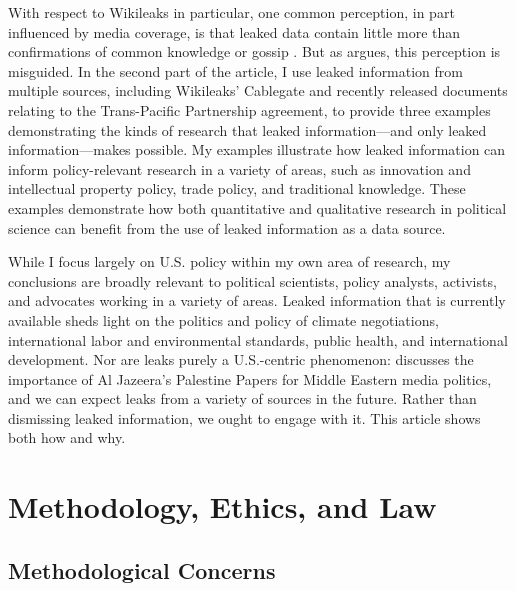 \documentclass[12pt]{article}
\begin{document}
With respect to Wikileaks in particular, one common perception, in part influenced by media 
coverage, is that leaked data contain little more than confirmations of common knowledge or 
gossip \citep{saunders2011wikileaks,chesterman2011wikileaks}. But as \citet{bob2010wikileaks} argues, this perception is 
misguided. In the second part of the article, I use leaked information from multiple sources, including Wikileaks' 
Cablegate and recently 
released documents relating to the Trans-Pacific Partnership agreement, to provide three examples 
demonstrating the kinds of research that leaked information---and only leaked information---makes possible. 
My examples illustrate how leaked information can inform policy-relevant research in a variety of areas, such as 
innovation and intellectual property policy, trade policy, and traditional knowledge.
These examples demonstrate 
how both quantitative and qualitative research in political science can benefit from the use of 
leaked information as a data source. 

While I focus largely on U.S. policy within my own area of research, my conclusions are broadly relevant 
to political scientists, policy analysts, activists, and advocates working in a variety of areas. 
Leaked information that is currently available sheds light on the politics and policy of climate negotiations, 
international labor and environmental standards, public health, and international development. Nor are leaks 
purely a U.S.-centric phenomenon: \citet{zayani2013jazeeras} discusses the importance of Al Jazeera's 
Palestine Papers for Middle Eastern media politics, and we can expect leaks from a variety of sources in the future. 
Rather than dismissing leaked information, we ought to engage with it. This article shows both how and why.




\section{Methodology, Ethics, and Law}

\subsection{Methodological Concerns}
\end{document}
